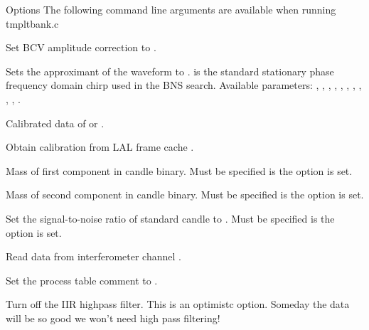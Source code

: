 \begin{entry}
\item[Options]
\noindent The following command line arguments are available when running tmpltbank.c
\\



\item[\option{--alpha} \parm{ alpha}] 
Set BCV amplitude correction to .

\item[\option{--approximant} \parm{ approx}] 
Sets the approximant of the waveform to .  is the standard stationary phase frequency domain chirp used in the BNS search. Available parameters: , , , , , , , , , , .


\item[\option{--calibrated-data} \parm{type}] 
Calibrated data of   or .

\item[\option{--calibration-cache} \parm{cal\_file}] 
Obtain calibration from LAL frame cache .

\item[\option{--candle-mass1} \parm{candle\_mass1}] 
Mass   of first component in candle binary.  Must be specified is the option  is set.

\item[\option{--candle-mass2} \parm{candle\_mass2}] 
Mass  of second component in candle binary. Must be specified is the option  is set.

\item[\option{--candle-snr} \parm{candle\_snr}] 
Set the signal-to-noise ratio of standard candle to . Must be specified is the option  is set.

\item[\option{--channel-name} \parm{channel}] 
Read data from interferometer channel .

\item[\option{--comment} \parm{comment}] 
Set the process table comment to .

\item[\option{--disable-high-pass}] 
Turn off the IIR highpass filter.  This is an optimistc option. Someday the data will be so good we won't need high pass filtering!  


\end{entry}
